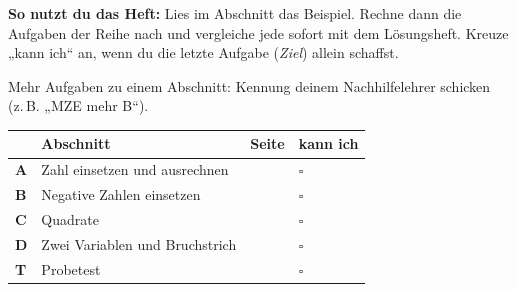 \documentclass[11pt]{article}
\begin{document}
\par\smallskip
{}\par\medskip
\noindent\textbf{So nutzt du das Heft:} Lies im Abschnitt das Beispiel. Rechne dann die Aufgaben der Reihe nach und vergleiche jede sofort mit dem Lösungsheft. Kreuze „kann ich“ an, wenn du die letzte Aufgabe (\emph{Ziel}) allein schaffst.\par
\noindent Mehr Aufgaben zu einem Abschnitt: Kennung deinem Nachhilfelehrer schicken (z.\,B. „MZE mehr B“).\par\medskip
{\renewcommand{\arraystretch}{1.3}
\noindent\begin{tabular}{|>{\bfseries}p{10mm}|p{112mm}|>{\raggedleft\arraybackslash}p{10mm}|>{\centering\arraybackslash}p{14mm}|}\hline
\rowcolor{black!8} & \textbf{Abschnitt} & \textbf{Seite} & \textbf{kann ich}\\\hline
A & Zahl einsetzen und ausrechnen & \pageref{s:A} & $\square$\\\hline
B & Negative Zahlen einsetzen & \pageref{s:B} & $\square$\\\hline
C & Quadrate & \pageref{s:C} & $\square$\\\hline
D & Zwei Variablen und Bruchstrich & \pageref{s:D} & $\square$\\\hline
T & Probetest & \pageref{s:T} & $\square$\\\hline
\end{tabular}}\par\bigskip
\end{document}
